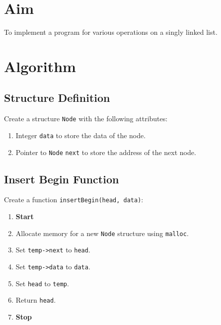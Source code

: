 
\section{Aim}
To implement a program for various operations on a singly linked list.

\section{Algorithm}
 {\selectfont

  \subsection{Structure Definition}
  Create a structure \texttt{Node} with the following attributes:
  \begin{enumerate}[label=\arabic*:,left=0pt]
    \item Integer \texttt{data} to store the data of the node.
    \item Pointer to \texttt{Node} \texttt{next} to store the address of the next node.
  \end{enumerate}

  \subsection{Insert Begin Function}
  Create a function \texttt{insertBegin(head, data)}:
  \begin{enumerate}[label=\arabic*:,left=0pt]
    \item \textbf{Start}
    \item Allocate memory for a new \texttt{Node} structure using \texttt{malloc}.
    \item Set \texttt{temp->next} to \texttt{head}.
    \item Set \texttt{temp->data} to \texttt{data}.
    \item Set \texttt{head} to \texttt{temp}.
    \item Return \texttt{head}.
    \item \textbf{Stop}
  \end{enumerate}

}
